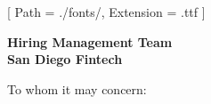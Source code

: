 


\renewcommand{\photo}[2]{}

\geometry{
  left=2cm,
  right=2cm,
  top=2cm,
  bottom=2cm
}



\makecvheader

\setmainfont{NotoSans-Regular}[
  Path = ./fonts/,
  Extension = .ttf
]

\vspace{1cm}
\indent\textbf{Hiring Management Team}\\
\indent\textbf{San Diego Fintech}

\vspace{0.5cm}

\noindent To whom it may concern:

\vspace{0.5cm}

